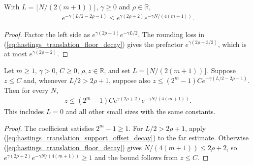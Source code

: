 \begin{lemma}
    \label{lem:hastings_translation_support_offset_decay}
    \leanok
    With $L=\lfloor N/(2(m+1))\rfloor$, $\gamma\ge0$ and $\rho\in\mathbb R$,
    \begin{align}
        e^{-\gamma(L/2-2\rho-1)}
        \le e^{\gamma(2\rho+2)}e^{-\gamma N/(4(m+1))}.
        \label{eq:hastings_translation_support_offset_decay}
    \end{align}
\end{lemma}
\begin{proof}\leanok
    Factor the left side as $e^{\gamma(2\rho+1)}e^{-\gamma L/2}$.
    The rounding loss in
    (\ref{eq:hastings_translation_floor_decay}) gives the prefactor
    $e^{\gamma(2\rho+3/2)}$, which is at most $e^{\gamma(2\rho+2)}$.
\end{proof}

\begin{lemma}
    \label{lem:hastings_translation_near_far_decay}
    \leanok
    Let $m\ge1$, $\gamma>0$, $C\ge0$, $\rho,z\in\mathbb R$, and set
    $L=\lfloor N/(2(m+1))\rfloor$. Suppose $z\le C$ and, whenever
    $L/2>2\rho+1$, suppose also
    $z\le(2^m-1)C e^{-\gamma(L/2-2\rho-1)}$. Then for every $N$,
    \begin{align}
        z\le(2^m-1)C e^{\gamma(2\rho+2)}e^{-\gamma N/(4(m+1))}.
        \label{eq:hastings_translation_near_far_decay}
    \end{align}
    This includes $L=0$ and all other small sizes with the same constants.
\end{lemma}
\begin{proof}\leanok
    The coefficient satisfies $2^m-1\ge1$. For $L/2>2\rho+1$, apply
    (\ref{eq:hastings_translation_support_offset_decay}) to the far estimate.
    Otherwise (\ref{eq:hastings_translation_floor_decay}) gives
    $N/(4(m+1))\le2\rho+2$, so
    $e^{\gamma(2\rho+2)}e^{-\gamma N/(4(m+1))}\ge1$ and the bound follows
    from $z\le C$.
\end{proof}

